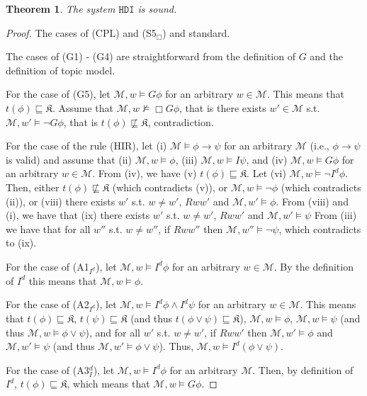\documentclass{article}
\newtheorem{theor}{Theorem}
\begin{document}
\begin{theor}

The system $\mathtt{HDI}$ is sound.

\end{theor}

\begin{proof}

The cases of (CPL) and (S5$_{\Box}$) and standard.

The cases of (G1) - (G4) are straightforward from the definition of $G$ and the definition of topic model.

For the case of (G5), let $\mathcal{M}, w \models G \phi$ for an  arbitrary $w \in \mathcal{M}$. This means that $t(\phi) \sqsubseteq \mathfrak{K}$. Assume that $\mathcal{M}, w \not \models \Box G \phi$, that is there exists $w' \in \mathcal{M}$ s.t. $\mathcal{M}, w' \models \neg G \phi$, that is $t(\phi) \not \sqsubseteq \mathfrak{K}$, contradiction.


For the case of the rule (HIR), let (i) $\mathcal{M} \models \phi \rightarrow \psi$ for an arbitrary $\mathcal{M}$ (i.e., $\phi \rightarrow \psi$ is valid) and assume that (ii) $\mathcal{M}, w \models \phi$, (iii) $\mathcal{M}, w \models I \psi$, and  (iv) $\mathcal{M}, w \models G \phi$ for an arbitrary $w \in \mathcal{M}$. From (iv), we have (v) $t(\phi) \sqsubseteq \mathfrak{K}$. Let (vi) $\mathcal{M}, w \models \neg I^{d} \phi$. Then, either $t(\phi) \not \sqsubseteq \mathfrak{K}$ (which contradicts (v)), or $\mathcal{M}, w \models \neg \phi$ (which contradicts (ii)), or (viii) there exists $w'$ s.t. $w \not = w'$, $Rww'$ and $\mathcal{M}, w' \models \phi$. From (viii) and (i), we have that (ix) there exists $w'$ s.t. $w \not = w'$, $Rww'$ and $\mathcal{M}, w' \models \psi$ From (iii) we have that for all $w''$ s.t. $w\not = w''$, if $Rww''$ then $\mathcal{M}, w'' \models \neg \psi$, which contradicts to (ix). 

For the case of (A1$_{I^{d}}$), let $\mathcal{M}, w \models I^{d} \phi$ for an arbitrary $w \in \mathcal{M}$. By the definition of $I^{d}$ this means that $\mathcal{M}, w \models \phi$.

For the case of (A2$_{I^{d}}$), let $\mathcal{M}, w \models I^{d} \phi \wedge I^{d} \psi$ for an arbitrary $w \in \mathcal{M}$. This means that $t(\phi) \sqsubseteq \mathfrak{K}$, $t(\psi) \sqsubseteq \mathfrak{K}$ (and thus $t(\phi \vee \psi) \sqsubseteq \mathfrak{K}$), $\mathcal{M}, w \models \phi$, $\mathcal{M}, w \models \psi$ (and thus $\mathcal{M}, w \models \phi \vee \psi$), and for all $w'$ s.t. $w \not = w'$, if $Rww'$ then $\mathcal{M}, w' \models \phi$ and $\mathcal{M}, w'  \models \psi$ (and thus $\mathcal{M}, w' \models \phi \vee \psi$). Thus, $\mathcal{M}, w \models I^{d} (\phi \vee \psi)$.

For the case of (A3$_I^{d}$), let $\mathcal{M}, w \models I^{d} \phi$ for an arbitrary $\mathcal{M}$. Then, by definition of $I^{d}$, $t(\phi) \sqsubseteq \mathfrak{K}$, which means that $\mathcal{M}, w \models G \phi$.


\end{proof}
\end{document}
